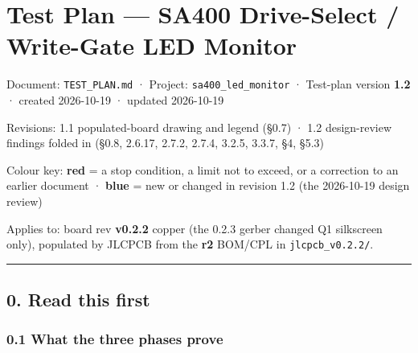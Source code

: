 \documentclass[
  10pt,
]{article}
\author{}
\date{}
\begin{document}
\hypertarget{test-plan-sa400-drive-select-write-gate-led-monitor}{%
\section{Test Plan --- SA400 Drive-Select / Write-Gate LED
Monitor}\label{test-plan-sa400-drive-select-write-gate-led-monitor}}

Document: \texttt{TEST\_PLAN.md} · Project:
\texttt{sa400\_led\_monitor} · Test-plan version
\textbf{1.2} · created 2026-10-19 · updated 2026-10-19

Revisions: 1.1 populated-board drawing and legend (§0.7) ·
1.2 design-review findings folded in (§0.8, 2.6.17, 2.7.2,
2.7.4, 3.2.5, 3.3.7, §4, §5.3)

Colour key: \textcolor[HTML]{B00000}{\textbf{red} = a stop
condition, a limit not to exceed, or a correction to an
earlier document} · \textcolor[HTML]{0040A0}{\textbf{blue} =
new or changed in revision 1.2 (the 2026-10-19 design
review)}

Applies to: board rev \textbf{v0.2.2} copper (the 0.2.3
gerber changed Q1 silkscreen only), populated by JLCPCB from
the \textbf{r2} BOM/CPL in \texttt{jlcpcb\_v0.2.2/}.

\begin{center}\rule{0.5\linewidth}{0.5pt}\end{center}

\hypertarget{read-this-first}{%
\subsection{0. Read this first}\label{read-this-first}}

\hypertarget{what-the-three-phases-prove}{%
\subsubsection{0.1 What the three phases
prove}\label{what-the-three-phases-prove}}
\end{document}

